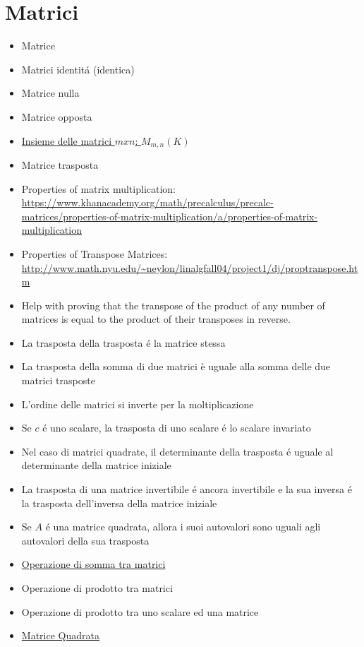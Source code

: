 \documentclass[a4paper,10pt]{article}
\begin{document}
\section{Matrici}
\begin{itemize}
   \item Matrice
   \item Matrici identit\'{a} (identica)
   \item Matrice nulla
   \item Matrice opposta
   \item \href{InsiemeDelleMatrici.html}{Insieme delle matrici $mxn$: $M_{m,n}(K)$}
   \item Matrice trasposta
   \item Properties of matrix multiplication: \url{https://www.khanacademy.org/math/precalculus/precalc-matrices/properties-of-matrix-multiplication/a/properties-of-matrix-multiplication}
   \item Properties of Transpose Matrices: \url{http://www.math.nyu.edu/~neylon/linalgfall04/project1/dj/proptranspose.htm}
   \item Help with proving that the transpose of the product of any number of matrices is equal to the product of their transposes in reverse.
   \item La trasposta della trasposta \'{e} la matrice stessa
   \item La trasposta della somma di due matrici è uguale alla somma delle due matrici trasposte
   \item L'ordine delle matrici si inverte per la moltiplicazione
   \item Se $c$ \'{e} uno scalare, la trasposta di uno scalare \'{e} lo scalare invariato
   \item Nel caso di matrici quadrate, il determinante della trasposta \'{e} uguale al determinante della matrice iniziale
   \item La trasposta di una matrice invertibile \'{e} ancora invertibile e la sua inversa \'{e} la trasposta dell'inversa della matrice iniziale
   \item Se $A$ \'{e} una matrice quadrata, allora i suoi autovalori sono uguali agli autovalori della sua trasposta
   \item \href{SommaMatrici.html}{Operazione di somma tra matrici}
   \item Operazione di prodotto tra matrici
   \item Operazione di prodotto tra uno scalare ed una matrice
   \item \href{MatriceQuadrata.html}{Matrice Quadrata}

\end{itemize}
\end{document}
